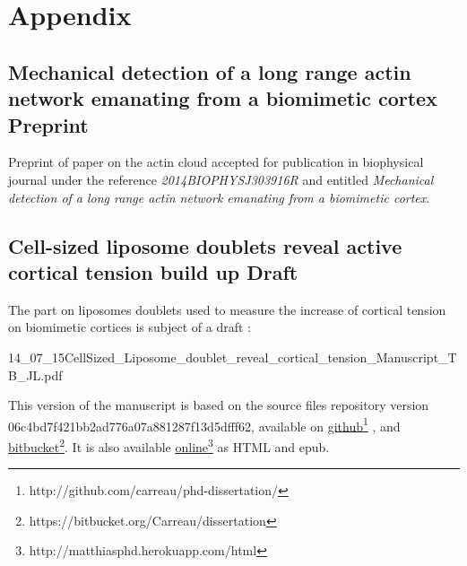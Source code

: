 \documentclass[A4paperpaper,11pt,english]{sphinxmanual}
\begin{document}
\chapter{Appendix}
\label{index-latex:appendix}\label{index-latex::doc}

\section{Mechanical detection of a long range actin network emanating from a biomimetic cortex Preprint}
\label{index-latex:mechanical-detection-of-a-long-range-actin-network-emanating-from-a-biomimetic-cortex-preprint}
Preprint of paper on the actin cloud accepted for publication in biophysical
journal under the reference \emph{2014BIOPHYSJ303916R} and entitled \emph{Mechanical
detection of a long range actin network emanating from a biomimetic cortex}.



\section{Cell-sized liposome doublets reveal active cortical tension build up Draft}
\label{index-latex:cell-sized-liposome-doublets-reveal-active-cortical-tension-build-up-draft}
The part on liposomes doublets used to measure the increase of cortical tension
on biomimetic cortices is subject of a draft :

{14_07_15CellSized_Liposome_doublet_reveal_cortical_tension_Manuscript_TB_JL.pdf}


This version of the manuscript is based on the source files repository version
06c4bd7f421bb2ad776a07a881287f13d5dfff62, available on \href{http://github.com/carreau/phd-dissertation/}{github}\footnote{http://github.com/carreau/phd-dissertation/}
, and \href{https://bitbucket.org/Carreau/dissertation}{bitbucket}\footnote{https://bitbucket.org/Carreau/dissertation}. It is also available \href{http://matthiasphd.herokuapp.com/html}{online}\footnote{http://matthiasphd.herokuapp.com/html} as HTML and epub.
\end{document}
